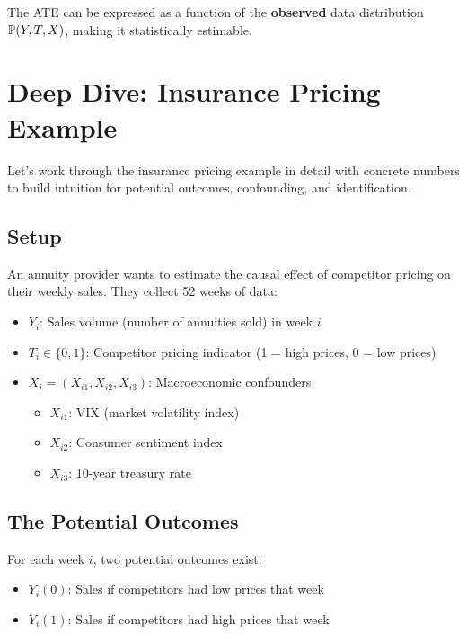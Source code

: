 \begin{remark}
The ATE can be expressed as a function of the \textbf{observed} data distribution $\mathbb{P}(Y, T, X)$, making it statistically estimable.
\end{remark}

\section{Deep Dive: Insurance Pricing
Example}\label{_deep_dive_insurance_pricing_example}

Let's work through the insurance pricing example in detail with concrete
numbers to build intuition for potential outcomes, confounding, and
identification.

\subsection{Setup}\label{_setup}

An annuity provider wants to estimate the causal effect of competitor
pricing on their weekly sales. They collect 52 weeks of data:

\begin{itemize}
\item
  \(Y_i\): Sales volume (number of annuities sold) in week \(i\)
\item
  \(T_i \in \{0, 1\}\): Competitor pricing indicator (1 = high prices, 0
  = low prices)
\item
  \(X_i = (X_{i1}, X_{i2}, X_{i3})\): Macroeconomic confounders

  \begin{itemize}
  \item
    \(X_{i1}\): VIX (market volatility index)
  \item
    \(X_{i2}\): Consumer sentiment index
  \item
    \(X_{i3}\): 10-year treasury rate
  \end{itemize}
\end{itemize}

\subsection{The Potential Outcomes}\label{_the_potential_outcomes}

For each week \(i\), two potential outcomes exist:

\begin{itemize}
\item
  \(Y_i(0)\): Sales if competitors had low prices that week
\item
  \(Y_i(1)\): Sales if competitors had high prices that week
\end{itemize}


